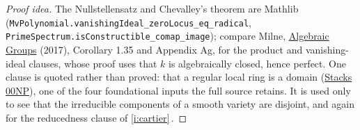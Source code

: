 \documentclass[11pt]{article}
\theoremstyle{plain}
\theoremstyle{definition}
\newcommand{\Cref}[1]{\hyperref[#1]{\ref{#1}}\,\hyperref[#1]{\nameref*{#1}}}
\newcommand{\stacks}[1]{\href{https://stacks.math.columbia.edu/tag/#1}{Stacks #1}}
\begin{document}
\begin{proof}[Proof idea]
The Nullstellensatz and Chevalley's theorem are Mathlib
(\nolinkurl{MvPolynomial.vanishingIdeal_zeroLocus_eq_radical},
\nolinkurl{PrimeSpectrum.isConstructible_comap_image}); compare Milne,
\href{https://www.jmilne.org/math/Books/iAG2017.pdf}{Algebraic Groups}
(2017), Corollary 1.35 and Appendix Ag, for the product and
vanishing-ideal clauses, whose proof uses that $k$ is algebraically closed,
hence perfect. One clause is quoted rather than proved: that a regular
local ring is a domain (\stacks{00NP}), one of the four foundational
inputs the full source retains. It is used only to see that the
irreducible components of a smooth variety are disjoint, and again for the
reducedness clause of \Cref{i:cartier}.
\end{proof}
\end{document}
